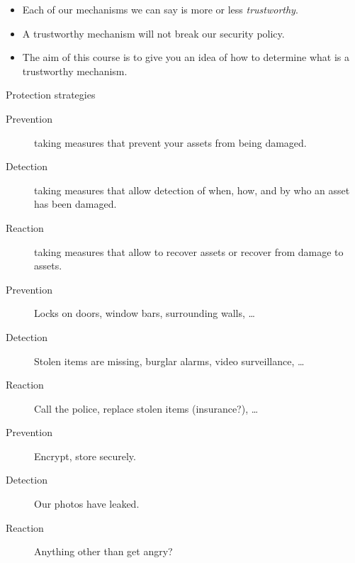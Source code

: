 \begin{frame}
  \begin{itemize}
    \item Each of our mechanisms we can say is more or less \emph{trustworthy}.
    \item A trustworthy mechanism will not break our security policy.

      \pause

    \item The aim of this course is to give you an idea of how to determine 
      what is a trustworthy mechanism.
  \end{itemize}
\end{frame}

\begin{frame}
  \begin{block}{Protection strategies}
    \begin{description}
      \item[Prevention] taking measures that prevent your assets from being 
        damaged.

      \item[Detection] taking measures that allow detection of when, how, and 
        by who an asset has been damaged.

      \item[Reaction] taking measures that allow to recover assets or recover 
        from damage to assets.
    \end{description}
  \end{block}
\end{frame}

\begin{frame}
  \begin{example}
    \begin{description}
      \item[Prevention] Locks on doors, window bars, surrounding walls, \dots
      \item[Detection] Stolen items are missing, burglar alarms, video 
        surveillance, \dots
      \item[Reaction] Call the police, replace stolen items (insurance?), \dots
    \end{description}
  \end{example}

  \pause

  \begin{example}
    \begin{description}
      \item[Prevention] Encrypt, store securely.
      \item[Detection] Our photos have leaked.
      \item[Reaction] Anything other than get angry?
    \end{description}
  \end{example}
\end{frame}

